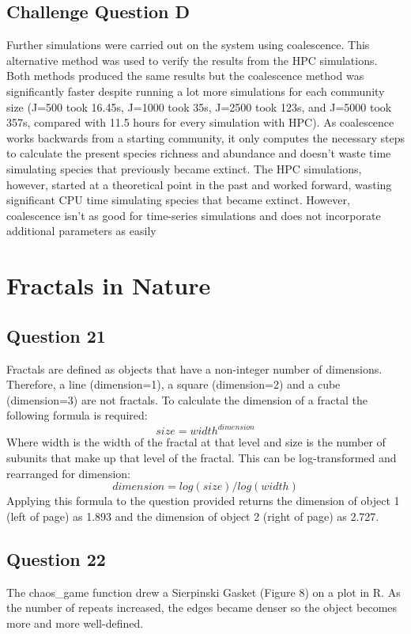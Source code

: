 \documentclass{article}
\begin{document}
\bigskip

\subsection*{Challenge Question D}
Further simulations were carried out on the system using coalescence. This alternative method
was used to verify the results from the HPC simulations. Both methods produced the same results 
but the coalescence method was significantly faster despite running a lot more simulations for each 
community size (J=500 took 16.45s, J=1000 took 35s, J=2500 took 123s, and J=5000 took 357s, compared with
11.5 hours for every simulation with HPC). As 
coalescence works backwards from a starting community, it only computes the necessary steps to calculate
the present species richness and abundance and doesn't waste time simulating species that previously became extinct.
The HPC simulations, however, started at a theoretical point in the past and worked forward, wasting 
significant CPU time simulating species that became extinct. However, coalescence isn't as good for time-series
simulations and does not incorporate additional parameters as easily

\break

\section*{Fractals in Nature} 

\bigskip

\subsection*{Question 21}
Fractals are defined as objects that have a non-integer number 
of dimensions. Therefore, a line (dimension=1), a square (dimension=2)
and a cube (dimension=3) are not fractals. To calculate the dimension
of a fractal the following formula is required:
\[ size = width^{dimension} \]
Where width is the width of the fractal at that level and size is the number of subunits
that make up that level of the fractal. This can be log-transformed and
rearranged for dimension:
\[ dimension = log(size)/log(width) \]
Applying this formula to the question provided returns the dimension of object
1 (left of page) as 1.893 and the dimension of object 2 (right of page) as 2.727.

\bigskip

\subsection*{Question 22}
The chaos\_game function drew a Sierpinski Gasket (Figure 8) on a plot in R. As the number of 
repeats increased, the edges became denser so the object becomes more 
and more well-defined.
\end{document}

